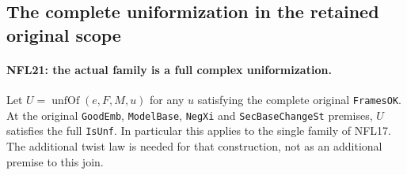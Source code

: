 \subsection{The complete uniformization in the retained original scope}

\paragraph{NFL21: the actual family is a full complex uniformization.}
\label{claim:NFL21}
Let $U=\operatorname{unfOf}(e,F,M,u)$ for any $u$ satisfying
the complete original \texttt{FramesOK}.  At the original
\texttt{GoodEmb}, \texttt{ModelBase}, \texttt{NegXi} and
\texttt{SecBaseChangeSt} premises, $U$ satisfies the full
\texttt{IsUnf}.  In particular this applies to the single
family of NFL17.  The additional twist law is needed for
that construction, not as an additional premise to this join.

